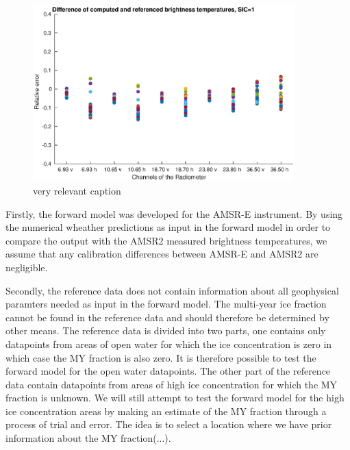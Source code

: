 \documentclass[11pt, a4paper]{article}
\begin{document}
\begin{figure}[h]
   \centering
   \includegraphics[width=0.9\textwidth]{ValidationForward_SIC1.eps}
   \caption{very relevant caption}
   \label{fig:for1}
\end{figure}


Firstly, the forward model was developed for the AMSR-E instrument. By using the numerical wheather predictions as input in the forward model in order to compare the output with the AMSR2 measured brightness temperatures, we assume that any calibration differences between AMSR-E and AMSR2 are negligible. 
\newline

Secondly, the reference data does not contain information about all geophysical paramters needed as input in the forward model. The multi-year ice fraction cannot be found in the reference data and should therefore be determined by other means. The reference data is divided into two parts, one contains only datapoints from areas of open water for which the ice concentration is zero in which case the MY fraction is also zero. It is therefore possible to test the forward model for the open water datapoints. The other part of the reference data contain datapoints from areas of high ice concentration for which the MY fraction is unknown. We will still attempt to test the forward model for the high ice concentration areas by making an estimate of the MY fraction through a process of trial and error. The idea is to select a location where we have prior information about the MY fraction(...).
\newline
\end{document}
